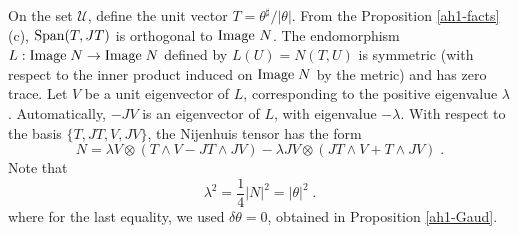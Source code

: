 \documentclass{amsart}
\begin{document}
%
%

On the set $\mathcal{U}$, define the unit vector $ T = \theta^{\sharp}/ |\theta|$. From the Proposition \ref{ah1-facts} (c), ${\rm Span}(T, JT)$ is orthogonal to ${\rm Image}~N $. The endomorphism $L : {\rm Image } \; N \rightarrow {\rm Image } \; N $ defined by $L(U) = N(T, U)$ is symmetric (with respect to the inner product induced on ${\rm Image} \; N $ by the metric) and has zero trace. Let $V$ be a unit eigenvector of $L$, corresponding to the positive eigenvalue $\lambda$. Automatically, $-JV$ is an eigenvector of $L$, with eigenvalue $-\lambda$. With respect to the basis $\{ T, JT, V, JV \}$, the Nijenhuis tensor has the form
\begin{equation} \label{N-specframe}
 N = \lambda V \otimes ( T \wedge V - JT \wedge JV ) - \lambda JV \otimes ( JT \wedge V + T \wedge JV ) \; .
\end{equation}
Note that 
\begin{equation} \label{lambsq}
    \lambda^2 = \frac{1}{4} |N|^2 = |\theta|^2 \; .
\end{equation}
where for the last equality, we used $\delta \theta = 0$, obtained in Proposition \ref{ah1-Gaud}.
\end{document}

